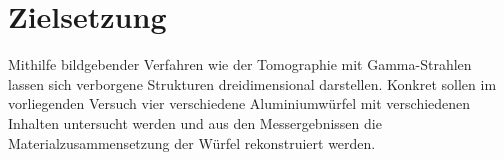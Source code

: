 \section{Zielsetzung}
Mithilfe bildgebender Verfahren wie der Tomographie mit Gamma-Strahlen lassen
sich verborgene Strukturen dreidimensional darstellen. Konkret sollen im
vorliegenden Versuch vier verschiedene Aluminiumwürfel mit verschiedenen Inhalten
untersucht werden und aus den Messergebnissen die Materialzusammensetzung der
Würfel rekonstruiert werden. 
